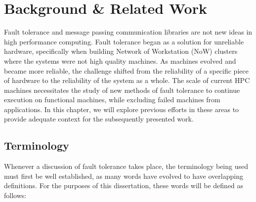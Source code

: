 \chapter{Background \& Related Work}
\label{chap:background}

Fault tolerance and message passing communication libraries are not new ideas in
high performance computing. Fault tolerance began as a solution for unreliable 
hardware, specifically when building Network of Workstation (NoW) clusters where the 
systems were not high quality machines. As machines evolved and became more reliable, 
the challenge shifted from the reliability of a specific piece of hardware to the 
reliability of the system as a whole. The scale of current HPC machines necessitates 
the study of new methods of fault tolerance to continue execution on functional 
machines, while excluding failed machines from applications. In this chapter, we will 
explore previous efforts in these areas to provide adequate context for the 
subsequently presented work.

\section{Terminology}
\label{sect:background:terminology}

Whenever a discussion of fault tolerance takes place, the terminology being used 
must first be well established, as many words have evolved to have overlapping 
definitions. For the purposes of this dissertation, these words will be defined 
as follows:

